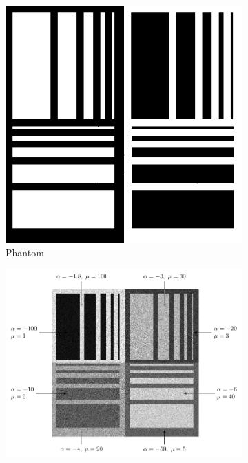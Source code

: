 \documentclass[
  lettersize  journal,
]{IEEEtran}%
\begin{document}
\begin{figure}[hbt]
    \centering
     \begin{subfigure}{0.25\textwidth}
        \includegraphics[width=\linewidth]{./Figures/Phantom1.png}
        \caption{Phantom}
        \label{fig:sim_Phantom_1}
    \end{subfigure}
   \hspace{0.00001\textwidth}
    \begin{subfigure}{0.35\textwidth}
        \includegraphics[width=\linewidth]{./Figures/Phantom4_L9.pdf}

\end{subfigure}
\end{figure}
\end{document}
